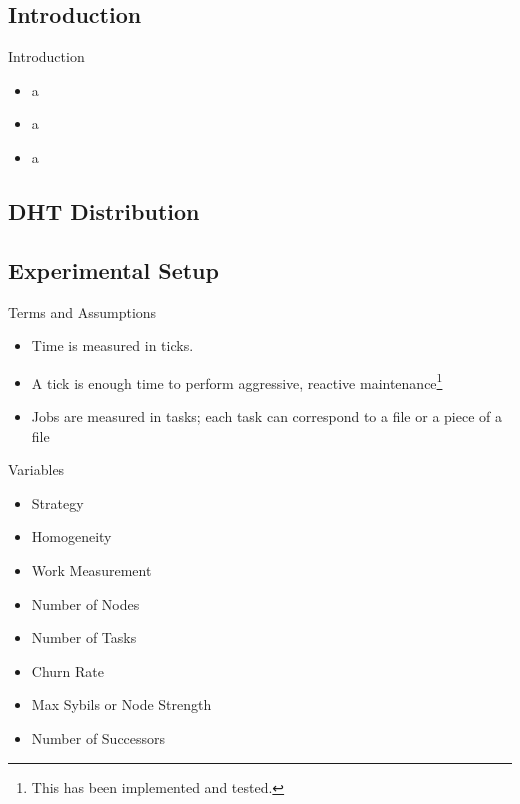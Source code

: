 \documentclass[11pt]{beamer}
\begin{document}
\subsection{Introduction}
\begin{frame}{Introduction}
	\begin{itemize}
		
		\item a
		\item a
		\item a
	\end{itemize}
\end{frame}


\subsection{DHT Distribution}

\subsection{Experimental Setup}
\begin{frame}{Terms and Assumptions}
	\begin{itemize}
		
		\item Time is measured in ticks.
		\item A tick is enough time to perform aggressive, reactive maintenance\footnote{This has been implemented and tested.}
		\item Jobs are measured in tasks; each task can correspond to a file or a piece of a file
		
	\end{itemize}
\end{frame}




\begin{frame}{Variables}
	\begin{itemize}
		
		\item Strategy
		\item Homogeneity 
		\item Work Measurement
		\item Number of Nodes
		\item Number of Tasks
		\item Churn Rate 
		\item Max Sybils or Node Strength
		\item Number of Successors
	\end{itemize}
\end{frame}
\end{document}
